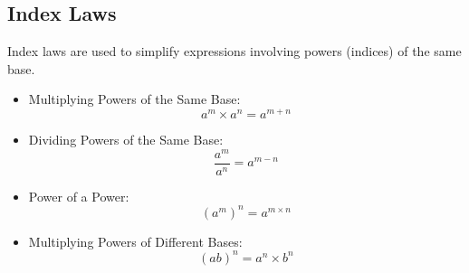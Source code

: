 
\subsection{Index Laws}
Index laws are used to simplify expressions involving powers (indices) of the same base.
\begin{itemize}
    \item Multiplying Powers of the Same Base:
    \begin{equation}
        a^m \times a^n = a^{m+n}
    \end{equation}
    \item Dividing Powers of the Same Base:
    \begin{equation}
        \frac{a^m}{a^n} = a^{m-n}
    \end{equation}
    \item Power of a Power:
    \begin{equation}
        \left(a^m\right)^n = a^{m \times n}
    \end{equation}
    \item Multiplying Powers of Different Bases:
    \begin{equation}
        \left(ab\right)^n = a^n \times b^n
    \end{equation}
\end{itemize}